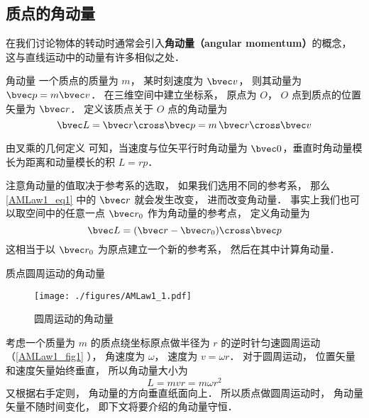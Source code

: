 

\subsection{质点的角动量}
在我们讨论物体的转动时通常会引入\textbf{角动量（angular momentum）}的概念， 这与直线运动中的动量有许多相似之处．

\begin{definition}{角动量}
一个质点的质量为 $m$， 某时刻速度为 $\bvec v$， 则其动量为 $\bvec p = m\bvec v$． 在三维空间中建立坐标系， 原点为 $O$， $O$ 点到质点的位置矢量为 $\bvec r$． 定义该质点关于 $O$ 点的角动量为
\begin{equation}\label{AMLaw1_eq1}
\bvec L = \bvec r \cross \bvec p = m \,\bvec r\cross \bvec v
\end{equation}
\end{definition}

由叉乘的几何定义 可知，当速度与位矢平行时角动量为 $\bvec 0$，垂直时角动量模长为距离和动量模长的积 $L = rp$．

注意角动量的值取决于参考系的选取， 如果我们选用不同的参考系， 那么\autoref{AMLaw1_eq1} 中的 $\bvec r$ 就会发生改变， 进而改变角动量． 事实上我们也可以取空间中的任意一点 $\bvec r_0$ 作为角动量的参考点， 定义角动量为
\begin{equation}
\bvec L = (\bvec r - \bvec r_0) \cross \bvec p
\end{equation}
这相当于以 $\bvec r_0$ 为原点建立一个新的参考系， 然后在其中计算角动量．

\begin{example}{质点圆周运动的角动量}
\begin{figure}[ht]
\centering
\texttt{[image: ./figures/AMLaw1\_1.pdf]}
\caption{圆周运动的角动量} \label{AMLaw1_fig1}
\end{figure}
考虑一个质量为 $m$ 的质点绕坐标原点做半径为 $r$ 的逆时针匀速圆周运动（\autoref{AMLaw1_fig1} ）， 角速度为 $\omega$， 速度为 $v = \omega r$． 对于圆周运动， 位置矢量和速度矢量始终垂直， 所以角动量大小为
\begin{equation}
L = mvr = m\omega r^2
\end{equation}
又根据右手定则， 角动量的方向垂直纸面向上． 所以质点做圆周运动时， 角动量矢量不随时间变化， 即下文将要介绍的角动量守恒．
\end{example}

